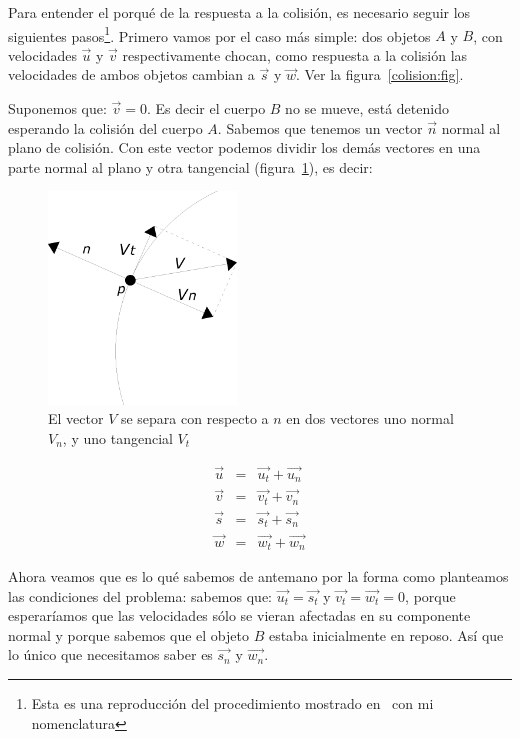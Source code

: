 Para entender el porqué de la respuesta a la colisión, es necesario seguir los siguientes pasos\footnote{Esta es una reproducción del procedimiento mostrado en~\cite{FisicaMatematicasVideojuegos} con mi nomenclatura}. Primero vamos por el caso más simple: dos objetos $A$ y $B$, con velocidades $\vec{u}$ y $\vec{v}$ respectivamente chocan, como respuesta a la colisión las velocidades de ambos objetos cambian a $\vec{s}$ y $\vec{w}$. Ver la figura~\ref{colision:fig}.

Suponemos que: $\vec{v} = 0$. Es decir el cuerpo $B$ no se mueve, está detenido esperando la colisión del cuerpo $A$. Sabemos que tenemos un vector $\vec{n}$ normal al plano de colisión. Con este vector podemos dividir los demás vectores en una parte normal al plano y otra tangencial  (figura~\ref{comVec:fig}), es decir:

\begin{figure}
 \centering
 \includegraphics[width=5cm]{Img/vector_componente}
 \caption[Separar componente tangencial y normal de un vector]{ 
 El vector $V$ se separa con respecto a $n$ en dos vectores uno normal $V_n$, y uno tangencial $V_t$ 
 } \label{comVec:fig}
\end{figure}

\begin{eqnarray}
 \vec{u} & = & \vec{u_t} + \vec{u_n} \nonumber \\
 \vec{v} & = & \vec{v_t} + \vec{v_n} \nonumber \\
 \vec{s} & = & \vec{s_t} + \vec{s_n} \nonumber \\
 \vec{w} & = & \vec{w_t} + \vec{w_n} \nonumber
\end{eqnarray}

Ahora veamos que es lo qué sabemos de antemano por la forma como planteamos las condiciones del problema: sabemos que: $\vec{u_t} = \vec{s_t}$ y $\vec{v_t} = \vec{w_t} = 0$, porque esperaríamos que las velocidades sólo se vieran afectadas en su componente normal y porque sabemos que el objeto $B$ estaba inicialmente en reposo. Así que lo único que necesitamos saber es $\vec{s_n}$ y $\vec{w_n}$.

